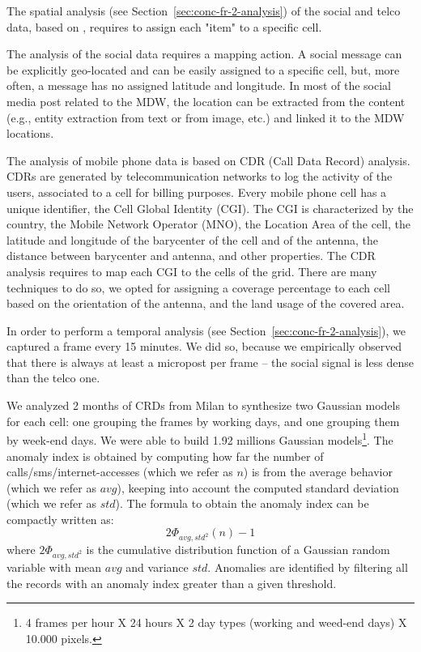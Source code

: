 
The spatial analysis (see Section~\ref{sec:conc-fr-2-analysis}) of the social and telco data, based on \frappe{}, requires to assign each "item" to a specific \textsf{cell}.

The analysis of the social data requires a mapping action. A social message can be explicitly geo-located and can be easily assigned to a specific \textsf{cell}, but, more often, a message has no assigned latitude and longitude. In most of the social media post related to the MDW, the location can be extracted from the content (e.g., entity extraction from text or from image, etc.) and linked it to the MDW locations.

The analysis of mobile phone data is based on CDR (Call Data Record) analysis. CDRs are generated by telecommunication networks to log the activity of the users, associated to a cell for billing purposes. Every mobile phone cell has a unique identifier, the Cell Global Identity (CGI). The CGI is characterized by the country, the Mobile Network Operator (MNO), the Location Area of the cell, the latitude and longitude of the barycenter of the cell and of the antenna, the distance between barycenter and antenna, and other properties.
The CDR analysis requires to map each CGI to the cells of the grid.
There are many techniques to do so, we opted for assigning a coverage percentage to each cell based on the orientation of the antenna, and the land usage of the covered area.

In order to perform a temporal analysis (see Section~\ref{sec:conc-fr-2-analysis}), we captured a \textsf{frame} every 15 minutes. We did so, because we empirically observed that there is always at least a micropost per \textsf{frame} -- the social signal is less dense than the telco one.

We analyzed 2 months of CRDs from Milan to synthesize two Gaussian models for each cell: one grouping the \textsf{frame}s by working days, and one grouping them by week-end days. We were able to build 1.92 millions Gaussian models\footnote{4 frames per hour X 24 hours X 2 day types (working and weed-end days) X 10.000 pixels.}.
The anomaly index is obtained by computing how far the number of calls/sms/internet-accesses (which we refer as $n$) is from the average behavior (which we refer as $avg$), keeping into account the computed
standard deviation (which we refer as $std$). The formula to obtain the anomaly index can be compactly written as:
\[
2\Phi_{avg,std^2} (n) - 1
\]
where $ 2\Phi_{avg,std^2} $ is the cumulative distribution function of a Gaussian random variable with mean $avg$ and variance $std$.
Anomalies are identified by filtering all the records with an anomaly index greater than a given threshold.

